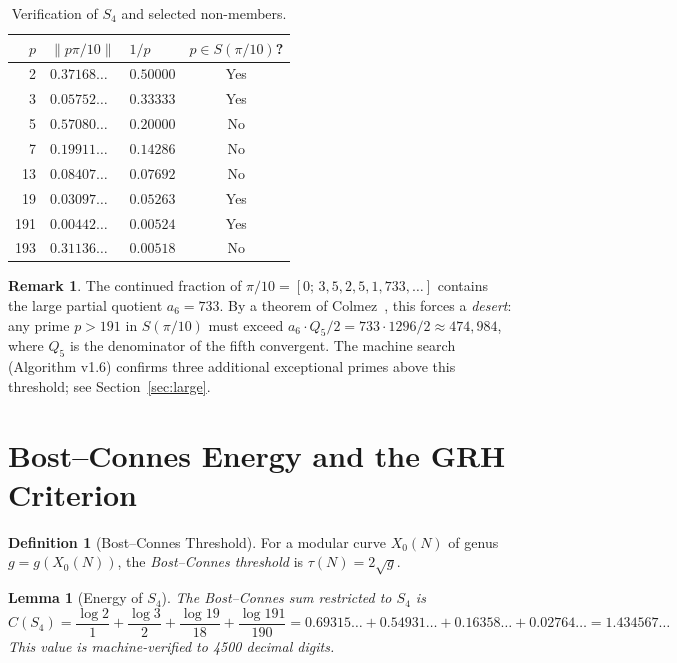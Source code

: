 \documentclass[11pt,letterpaper]{article}
\newtheorem{lemma}[theorem]{Lemma}
\theoremstyle{definition}
\newtheorem{definition}[theorem]{Definition}
\newtheorem{remark}[theorem]{Remark}
\begin{document}
\begin{table}[ht]
\centering
\caption{Verification of $S_4$ and selected non-members.}
\label{tab:s4}
\begin{tabular}{rllc@{}}
\hline
$p$ & $\|p\pi/10\|$ & $1/p$ & $p \in S(\pi/10)$? \\
\hline
2   & $0.37168\ldots$ & $0.50000$ & Yes \\
3   & $0.05752\ldots$ & $0.33333$ & Yes \\
5   & $0.57080\ldots$ & $0.20000$ & No  \\
7   & $0.19911\ldots$ & $0.14286$ & No  \\
13  & $0.08407\ldots$ & $0.07692$ & No  \\
19  & $0.03097\ldots$ & $0.05263$ & Yes \\
191 & $0.00442\ldots$ & $0.00524$ & Yes \\
193 & $0.31136\ldots$ & $0.00518$ & No  \\
\hline
\end{tabular}
\end{table}

\begin{remark}
The continued fraction of $\pi/10 = [0;\,3,5,2,5,1,733,\ldots]$ contains the large
partial quotient $a_6 = 733$.  By a theorem of Colmez~\cite{Colmez93}, this forces a
\emph{desert}: any prime $p > 191$ in $S(\pi/10)$ must exceed
$a_6 \cdot Q_5 / 2 = 733 \cdot 1296/2 \approx 474{,}984$, where $Q_5$ is the
denominator of the fifth convergent.  The machine search (Algorithm v1.6) confirms
three additional exceptional primes above this threshold; see Section~\ref{sec:large}.
\end{remark}

\section{Bost--Connes Energy and the GRH Criterion}

\begin{definition}[Bost--Connes Threshold]
For a modular curve $X_0(N)$ of genus $g = g(X_0(N))$, the \emph{Bost--Connes
threshold} is $\tau(N) = 2\sqrt{g}$.
\end{definition}

\begin{lemma}[Energy of $S_4$]\label{lem:s4energy}
The Bost--Connes sum restricted to $S_4$ is
\[
  C(S_4) = \frac{\log 2}{1} + \frac{\log 3}{2} + \frac{\log 19}{18}
           + \frac{\log 191}{190}
         = 0.69315\ldots + 0.54931\ldots + 0.16358\ldots + 0.02764\ldots
         = 1.434567\ldots
\]
This value is machine-verified to 4500 decimal digits.
\end{lemma}
\end{document}
